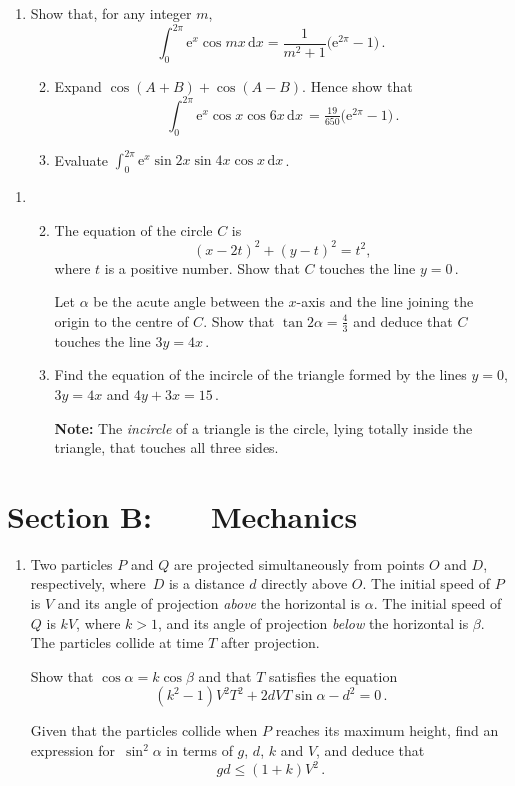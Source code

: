 \documentclass[a4, 11pt]{report}
\newlength{\qspace}
\newcounter{qnumber}
\newenvironment{question}%
 {\vspace{\qspace}
  \begin{enumerate}[\bfseries 1\quad][10]%
    \setcounter{enumi}{\value{qnumber}}%
    \item%
 }
{
  \end{enumerate}
  \filbreak
  \stepcounter{qnumber}
 }
\newenvironment{questionparts}[1][1]%
 {
  \begin{enumerate}[\bfseries (i)]%
    \setcounter{enumii}{#1}
    \addtocounter{enumii}{-1}
    \setlength{\itemsep}{5mm}
    \setlength{\parskip}{8pt}
 }
 {
  \end{enumerate}
 }
\def\d{{\mathrm d}}
\def\e{{\mathrm e}}
\def\le{\leqslant}
\begin{document}
\begin{question}
Show that, for any integer $m$, 
\[
\int_0^{2\pi} \e^x \cos mx \, \d x = \frac
    {1}{m^2+1}\big(\e^{2\pi}-1\big)\,.
\]

\begin{questionparts}
\item
Expand 
 $\cos(A+B) +\cos(A-B)$.  Hence show that
\[\displaystyle 
\int_0^{2\pi} \e^x \cos x \cos 6x \, \d x\, 
= \tfrac{19}{650}\big( \e^{2\pi}-1\big)\,.
\]
\item Evaluate $\displaystyle 
\int_0^{2\pi} \e^x \sin 2x \sin 4x \cos x \, \d x\,$.
\end{questionparts}
\end{question}
		
\begin{question}
\begin{questionparts}
\item
 The equation of the circle $C$ is 
\[
(x-2t)^2 +(y-t)^2 =t^2,
\]
where $t$ is a positive number.
Show that $C$ touches the line $y=0\,$.

Let $\alpha$ be the acute angle between the $x$-axis and the 
line joining the origin to the centre of $C$. Show that $\tan2\alpha
=\frac43$ and deduce that $C$ touches the line $3y=4x\,$.

\item Find the equation of the incircle of the triangle formed by 
the lines $y=0$, $3y=4x$ and $4y+3x=15\,$.

{\bf Note:} The {\em incircle} of a triangle is the circle,
lying totally inside the
triangle, that touches all three sides.


\end{questionparts}
\end{question}	
		

		
	
\newpage
\section*{Section B: \ \ \ Mechanics}


	
\begin{question}
Two particles $P$ and $Q$ are projected simultaneously from points
$O$ and $D$, respectively, where~$D$ is a distance $d$ directly
above $O$. The initial speed of $P$ is $V$ and its angle of projection
{\em above} the horizontal is $\alpha$. The initial speed of $Q$ is 
$kV$, where $k>1$, and its angle of projection {\em below} the horizontal
is $\beta$. The particles collide at time $T$ after projection.

Show that $\cos\alpha = k\cos\beta$ and that  
$T$ satisfies the equation
\[
(k^2-1)V^2T^2 +2dVT\sin\alpha -d^2 =0\,.
\]

Given that the particles collide when $P$ reaches its maximum height,
find an expression for~$\sin^2\alpha$ in terms of $g$, $d$, $k$ and
$V$,
and deduce that 
\[
gd\le (1+k)V^2\,.
\]

	\end{question}
	
\end{document}
